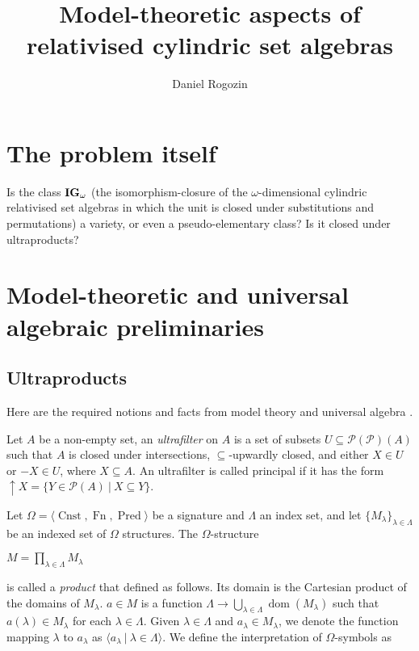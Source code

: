 \documentclass[a4paper]{article}
\author{Daniel Rogozin}
\date{}
\title{Model-theoretic aspects of relativised cylindric set algebras}
\theoremstyle{defin}
\theoremstyle{theorem}
\theoremstyle{prop}
\theoremstyle{lemma}
\theoremstyle{ex}
\theoremstyle{col}
\begin{document}
\maketitle

\nocite{*}

\section{The problem itself}

Is the class ${\bf IG}_{\omega}$ (the isomorphism-closure of the $\omega$-dimensional cylindric relativised set algebras in which the unit is closed under substitutions and permutations) a variety, or even
a pseudo-elementary class? Is it closed under ultraproducts?

\section{Model-theoretic and universal algebraic preliminaries}

\subsection{Ultraproducts}

Here are the required notions and facts from model theory and universal algebra \cite{hirsch2002relation} \cite{hodges1997shorter} \cite{sankappanavar1981course}.

Let $A$ be a non-empty set, an \emph{ultrafilter} on $A$ is a set of subsets $U \subseteq \mathcal{P}(\mathcal{P})(A)$ such that $A$ is closed under intersections, $\subseteq$-upwardly closed, and either $X \in U$ or $- X \in U$, where $X \subseteq A$. An ultrafilter is called principal if it has the form $\uparrow X = \{ Y \in \mathcal{P}(A) \: | \: X \subseteq Y \}$.

Let $\Omega = \langle \operatorname{Cnst}, \operatorname{Fn}, \operatorname{Pred} \rangle$ be a signature and $\Lambda$ an index set, and let $\{ M_{\lambda}\}_{\lambda \in \Lambda}$ be an indexed set of $\Omega$ structures. The $\Omega$-structure
\begin{center}
  $M = \prod \limits_{\lambda \in \Lambda} M_{\lambda}$
\end{center}
is called a \emph{product} that defined as follows. Its domain is the Cartesian product of the domains of $M_{\lambda}$. $a \in M$ is a function $\Lambda \to \bigcup \limits_{\lambda \in \Lambda} \operatorname{dom}(M_{\lambda})$ such that $a(\lambda) \in M_{\lambda}$ for each $\lambda \in \Lambda$.
Given $\lambda \in \Lambda$ and $a_{\lambda} \in M_{\lambda}$, we denote the function mapping $\lambda$ to $a_{\lambda}$ as
$\langle a_{\lambda} \: | \: \lambda \in \Lambda \rangle$. We define the interpretation of $\Omega$-symbols as
\end{document}
